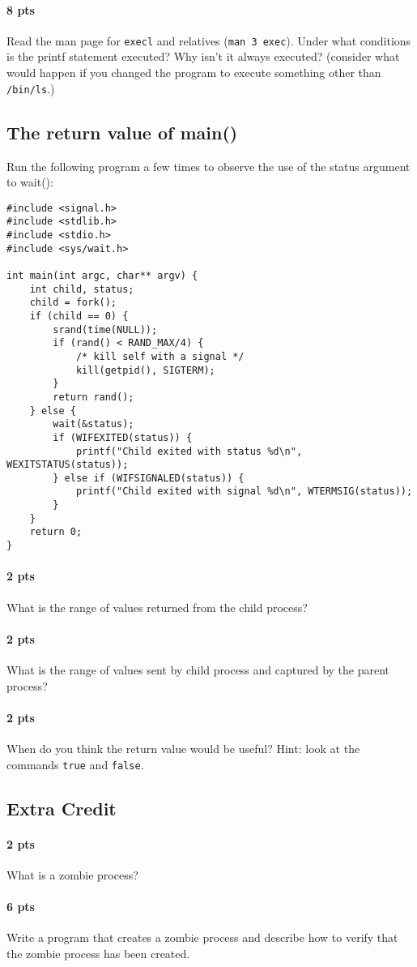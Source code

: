 \documentclass[letterpaper,10pt]{article}
\newcommand{\cmd}[1]{\texttt{#1}}
\begin{document}
\paragraph{8 pts} Read the man page for \cmd{execl} and relatives (\cmd{man 3 exec}).
Under what conditions is the printf statement executed? Why isn't it always executed?
(consider what would happen if you changed the program to execute something other than \cmd{/bin/ls}.)

\subsection{The return value of main()}
Run the following program a few times to observe the use of the status argument to wait():
\begin{verbatim}
#include <signal.h>
#include <stdlib.h>
#include <stdio.h>
#include <sys/wait.h>

int main(int argc, char** argv) {
    int child, status;
    child = fork();
    if (child == 0) {
        srand(time(NULL));
        if (rand() < RAND_MAX/4) {
            /* kill self with a signal */
            kill(getpid(), SIGTERM);
        }
        return rand();
    } else {
        wait(&status);
        if (WIFEXITED(status)) {
            printf("Child exited with status %d\n", WEXITSTATUS(status));
        } else if (WIFSIGNALED(status)) {
            printf("Child exited with signal %d\n", WTERMSIG(status));
        }
    }
    return 0;
}
\end{verbatim}


\paragraph{2 pts} What is the range of values returned from the child process?

\paragraph{2 pts} What is the range of values sent by child process and captured by the parent process?

\paragraph{2 pts} When do you think the return value would be useful? Hint: look at the commands \cmd{true} and \cmd{false}.

\subsection{Extra Credit}
\paragraph{2 pts} What is a zombie process?
\paragraph{6 pts} Write a program that creates a zombie process and describe how to verify that the zombie process has been created.
\end{document}

